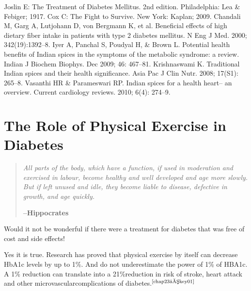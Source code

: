 \clearpage

\begin{thebibliography}{99}
 Joslin E: The Treatment of Diabetes Mellitus. 2nd edition. Phila\-delphia: Lea \& Febiger; 1917.
 Cox C: The Fight to Survive. New York: Kaplan; 2009.
 Chandali M, Garg A, Lutjohann D, von Bergmann K, et al. Beneficial effects of high dietary fiber intake in patients with type 2 diabetes mellitus. N Eng J Med. 2000; 342(19):1392–8.
 Iyer A, Panchal S, Poudyal H, \& Brown L. Potential health benefits of Indian spices in the symptoms of the metabolic syndrome: a review. Indian J Biochem Biophys. Dec 2009; 46: 467–81.
 Krishnaswami K. Traditional Indian spices and their health signi\-ficance. Asia Pac J Clin Nutr. 2008; 17(S1): 265–8.
 Vasanthi HR \& Parameswari RP. Indian spices for a health heart– an overview. Current cardiology reviews. 2010; 6(4): 274–9.
\end{thebibliography}

\newpage

\chapter{The Role of Physical Exercise in Diabetes}\label{chap23}

\begin{quote}
\textit{All parts of the body, which have a function, if used in moderation and exercised in labour, become healthy and well developed and age more slowly. But if left unused and idle, they become liable to disease, defective in growth, and age quickly.}
\vspace{-\topsep}
\begin{flushright}
\textbf{–Hippocrates}
\end{flushright}
\end{quote}
\vspace{-\topsep}

Would it not be wonderful if there were a treatment for diabetes that was free of cost and side effects!

Yes it is true. Research has proved that physical exercise by it\-self can decrease HbA1c levels by up to 1\%. And do not underestimate the power of 1\% of HBA1c. A 1\% reduction can translate into a 21\%\break reduction in risk of stroke, heart attack and other microvascular\break complications of diabetes.$^{\text{\cite{chap23–key01}}}$

